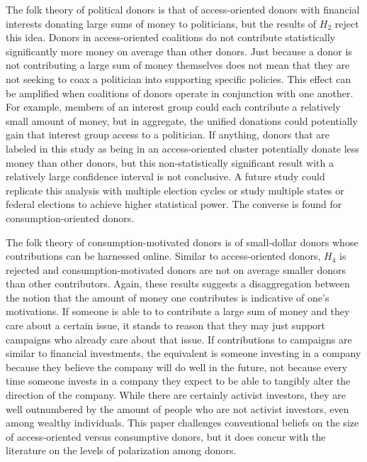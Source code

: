 \documentclass[12pt,]{article}
\begin{document}
The folk theory of political donors is that of access-oriented donors
with financial interests donating large sums of money to politicians,
but the results of \(H_{2}\) reject this idea. Donors in access-oriented
coalitions do not contribute statistically significantly more money on
average than other donors. Just because a donor is not contributing a
large sum of money themselves does not mean that they are not seeking to
coax a politician into supporting specific policies. This effect can be
amplified when coalitions of donors operate in conjunction with one
another. For example, members of an interest group could each contribute
a relatively small amount of money, but in aggregate, the unified
donations could potentially gain that interest group access to a
politician. If anything, donors that are labeled in this study as being
in an access-oriented cluster potentially donate less money than other
donors, but this non-statistically significant result with a relatively
large confidence interval is not conclusive. A future study could
replicate this analysis with multiple election cycles or study multiple
states or federal elections to achieve higher statistical power. The
converse is found for consumption-oriented donors.

The folk theory of consumption-motivated donors is of small-dollar
donors whose contributions can be harnessed online. Similar to
access-oriented donors, \(H_{4}\) is rejected and consumption-motivated
donors are not on average smaller donors than other contributors. Again,
these results suggests a disaggregation between the notion that the
amount of money one contributes is indicative of one's motivations. If
someone is able to to contribute a large sum of money and they care
about a certain issue, it stands to reason that they may just support
campaigns who already care about that issue. If contributions to
campaigns are similar to financial investments, the equivalent is
someone investing in a company because they believe the company will do
well in the future, not because every time someone invests in a company
they expect to be able to tangibly alter the direction of the company.
While there are certainly activist investors, they are well outnumbered
by the amount of people who are not activist investors, even among
wealthy individuals. This paper challenges conventional beliefs on the
size of access-oriented versus consumptive donors, but it does concur
with the literature on the levels of polarization among donors.
\end{document}
